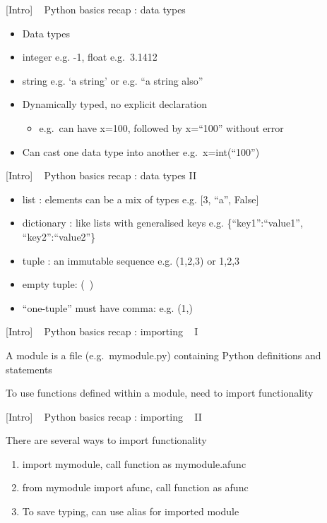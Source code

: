 \documentclass{article}
\begin{document}
    {[}Intro{]} ~ Python basics recap : data types

\begin{itemize}
\item
  Data types
\item
  integer e.g. -1, float e.g.~3.1412
\item
  string e.g. `a string' or e.g. ``a string also''
\item
  Dynamically typed, no explicit declaration

  \begin{itemize}
  \itemsep1pt\parskip0pt
  \item
    e.g.~can have x=100, followed by x=``100'' without error
  \end{itemize}
\item
  Can cast one data type into another e.g.~x=int(``100'')
\end{itemize}

    {[}Intro{]} ~ Python basics recap : data types II

\begin{itemize}
\itemsep1pt\parskip0pt
\item
  list : elements can be a mix of types e.g. {[}3, ``a'', False{]}
\item
  dictionary : like lists with generalised keys e.g.
  \{``key1'':``value1'', ``key2'':``value2''\}
\item
  tuple : an immutable sequence e.g. (1,2,3) or 1,2,3
\item
  empty tuple: (~)
\item
  ``one-tuple'' must have comma: e.g. (1,)
\end{itemize}

    {[}Intro{]} ~ Python basics recap : importing ~ I

A module is a file (e.g.~mymodule.py) containing Python definitions and
statements

To use functions defined within a module, need to import functionality

    {[}Intro{]} ~ Python basics recap : importing ~ II

There are several ways to import functionality

\begin{enumerate}
\def\labelenumi{\arabic{enumi}.}
\itemsep1pt\parskip0pt
\item
  import mymodule, call function as mymodule.afunc
\item
  from mymodule import afunc, call function as afunc
\item
  To save typing, can use alias for imported module
\end{enumerate}
\end{document}
